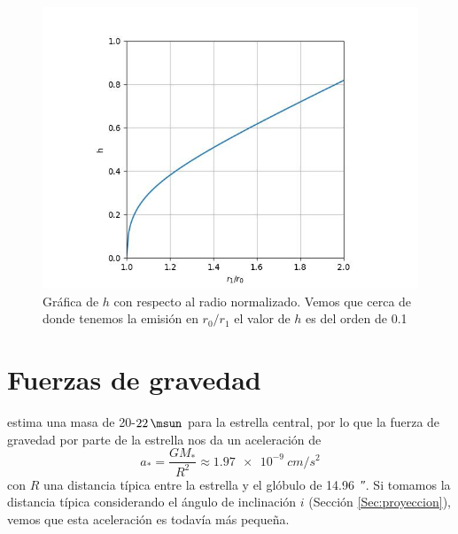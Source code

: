 \documentclass{book}
\begin{document}
\begin{figure}
    \centering
    \includegraphics{Appendices/h_3.jpg}
    \caption{Gráfica de $h$ con respecto al radio normalizado. Vemos que cerca de donde tenemos la emisión en $r_0/r_1$ el valor de $h$ es del orden de 0.1}
    \label{fig:h}
\end{figure}

\section{Fuerzas de gravedad} \label{F gravedad}

\cite{Hamann:2019} estima una masa  de 20-$\SI{22}{\msun}$ para la estrella central, por lo que la fuerza de gravedad por parte de la estrella nos da un aceleración de 
\begin{equation}
a_*=\frac{GM_*}{R^2}\approx \SI{1.97e-9}{cm/s^2}
\end{equation}
con $R$ una distancia típica entre la estrella y el glóbulo de \SI{14.96}{\arcsecond}. Si tomamos la distancia típica considerando el ángulo de inclinación $i$ (Sección \ref{Sec:proyeccion}), vemos que esta aceleración es todavía más pequeña.
\end{document}

